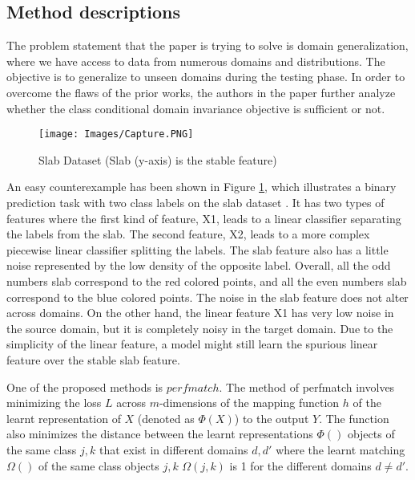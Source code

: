 
\subsection{Method descriptions}
The problem statement that the paper is trying to solve is domain generalization, where we have access to data from numerous domains and distributions. The objective is to generalize to unseen domains during the testing phase. In order to overcome the flaws of the prior works, the authors in the paper further analyze whether the class conditional domain invariance objective is sufficient or not. 

\begin{figure}[h]
\centering
\texttt{[image: Images/Capture.PNG]}
\caption{Slab Dataset (Slab (y-axis) is the stable feature)~\cite{domaingen2021}} 
\label{Figure-2}
\end{figure}

An easy counterexample has been shown in Figure \ref{Figure-2}, which illustrates a binary prediction task with two class labels on the slab dataset \cite{slab}. It has two types of features where the first kind of feature, X1, leads to a linear classifier separating the labels from the slab. The second feature, X2, leads to a more complex piecewise linear classifier splitting the labels. The slab feature also has a little noise represented by the low density of the opposite label. Overall, all the odd numbers slab correspond to the red colored points, and all the even numbers slab correspond to the blue colored points. The noise in the slab feature does not alter across domains. On the other hand, the linear feature X1 has very low noise in the source domain, but it is completely noisy in the target domain. Due to the simplicity of the linear feature, a model might still learn the spurious linear feature over the stable slab feature.

One of the proposed methods is \(perfmatch\). The method of perfmatch involves minimizing the loss \(L\) across \(m\)-dimensions of the mapping function \(h\) of the learnt representation of \(X\) (denoted as \(\Phi(X)\)) to the output \(Y\). The function also minimizes the distance between the learnt representations \(\Phi()\) objects of the same class \(j, k\) that exist in different domains \(d, d'\) where the learnt matching \(\Omega()\) of the same class objects \(j,k\) \(\Omega(j,k)\) is 1 for the different domains \(d\neq d'\).

